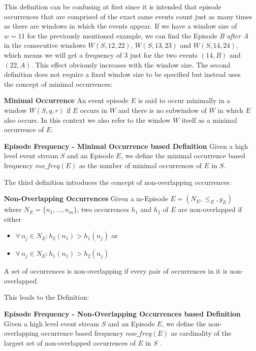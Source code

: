 This definition can be confusing at first since it is intended that episode occurrences that are comprised of the exact same events count just as many times as there are windows in which the events appear. If we have a window size of $w=11$ for the previously mentioned example, we can find the Episode \textit{B after A} in the consecutive windows $W(S,12,22)$, $W(S,13,23)$ and $W(S,14,24)$, which means we will get a frequency of $3$ just for the two events $(14,B)$ and $(22,A)$. This effect obviously increases with the window size. \newline
The second definition does not require a fixed window size to be specified but instead uses the concept of minimal occurrences:

\begin{mydef}
\textbf{Minimal Occurrence} An event episode $E$ is said to occur minimally in a window $W(S,q,r)$ if $E$ occurs in $W$ and there is no subwindow of $W$ in which $E$ also occurs. In this context we also refer to the window $W$ itself as a minimal occurrence of $E$.
\end{mydef}

\begin{mydef}
\textbf{Episode Frequency - Minimal Occurrence based Definition} Given a high level event stream $S$ and an Episode $E$, we define the minimal occurrence based frequency $mo\_freq(E)$ as the number of minimal occurrences of $E$ in $S$.
\end{mydef}

The third definition introduces the concept of non-overlapping occurrences:

\begin{mydef}
\textbf{Non-Overlapping Occurrences} Given a m-Episode $E = (N_E,{\leq}_{E},g_E)$ where $N_E = \{n_1,...,n_m\}$, two occurrences $h_1$ and $h_2$ of $E$ are non-overlapped if either 
\begin{itemize}
	\item $\forall \, n_j \in N_E : h_2(n_1)>h_1(n_j)$ or 
	\item $\forall \, n_j \in N_E : h_1(n_1)>h_2(n_j)$
\end{itemize}
A set of occurrences is non-overlapping if every pair of occurrences in it is non-overlapped.
\end{mydef}

This leads to the Definition:

\begin{mydef}
\textbf{Episode Frequency - Non-Overlapping Occurrences based Definition} Given a high level event stream $S$ and an Episode $E$, we define the non-overlapping occurrence based frequency $noo\_freq(E)$ as cardinality of the largest set of non-overlapped occurrences of $E$ in $S$ \cite{laxman2007fast}.
\end{mydef}



